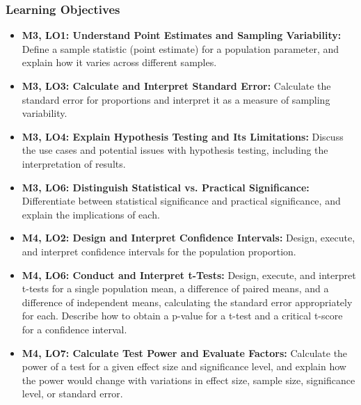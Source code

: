 \begin{frame}
    \frametitle{Learning Objectives}
    \begin{itemize}
        \item \textbf{M3, LO1: Understand Point Estimates and Sampling Variability:} Define a sample statistic (point estimate) for a population parameter, and explain how it varies across different samples.
        \item \textbf{M3, LO3: Calculate and Interpret Standard Error:} Calculate the standard error for proportions and interpret it as a measure of sampling variability.
        \item \textbf{M3, LO4: Explain Hypothesis Testing and Its Limitations:} Discuss the use cases and potential issues with hypothesis testing, including the interpretation of results.
        \item \textbf{M3, LO6: Distinguish Statistical vs. Practical Significance:} Differentiate between statistical significance and practical significance, and explain the implications of each.
        \item \textbf{M4, LO2: Design and Interpret Confidence Intervals:} Design, execute, and interpret confidence intervals for the population proportion.
        \item \textbf{M4, LO6: Conduct and Interpret t-Tests:} Design, execute, and interpret t-tests for a single population mean, a difference of paired means, and a difference of independent means, calculating the standard error appropriately for each. Describe how to obtain a p-value for a t-test and a critical t-score for a confidence interval.    
        \item \textbf{M4, LO7: Calculate Test Power and Evaluate Factors:} Calculate the power of a test for a given effect size and significance level, and explain how the power would change with variations in effect size, sample size, significance level, or standard error.
    \end{itemize}
\end{frame}
    
